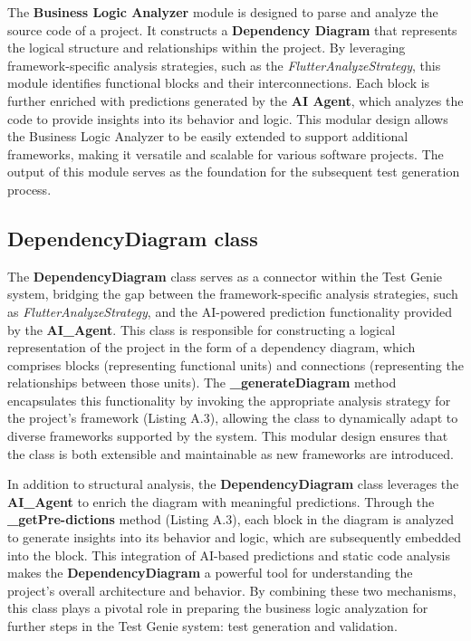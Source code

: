 The \textbf{Business Logic Analyzer} module is designed to parse and analyze the source code of a project. It constructs a \textbf{Dependency Diagram} that represents the logical structure and relationships within the project. By leveraging framework-specific analysis strategies, such as the \textit{FlutterAnalyzeStrategy}, this module identifies functional blocks and their interconnections. Each block is further enriched with predictions generated by the \textbf{AI Agent}, which analyzes the code to provide insights into its behavior and logic. This modular design allows the Business Logic Analyzer to be easily extended to support additional frameworks, making it versatile and scalable for various software projects. The output of this module serves as the foundation for the subsequent test generation process.

\subsection{DependencyDiagram class}

The \textbf{DependencyDiagram} class serves as a connector within the Test Genie system, bridging the gap between the framework-specific analysis strategies, such as \textit{FlutterAnalyzeStrategy}, and the AI-powered prediction functionality provided by the \textbf{AI\_Agent}. This class is responsible for constructing a logical representation of the project in the form of a dependency diagram, which comprises blocks (representing functional units) and connections (representing the relationships between those units). The \textbf{\_generateDiagram} method encapsulates this functionality by invoking the appropriate analysis strategy for the project's framework (Listing A.3), allowing the class to dynamically adapt to diverse frameworks supported by the system. This modular design ensures that the class is both extensible and maintainable as new frameworks are introduced.

In addition to structural analysis, the \textbf{DependencyDiagram} class leverages the \textbf{AI\_Agent} to enrich the diagram with meaningful predictions. Through the \textbf{\_getPre-dictions} method (Listing A.3), each block in the diagram is analyzed to generate insights into its behavior and logic, which are subsequently embedded into the block. This integration of AI-based predictions and static code analysis makes the \textbf{DependencyDiagram} a powerful tool for understanding the project's overall architecture and behavior. By combining these two mechanisms, this class plays a pivotal role in preparing the business logic analyzation for further steps in the Test Genie system: test generation and validation.

